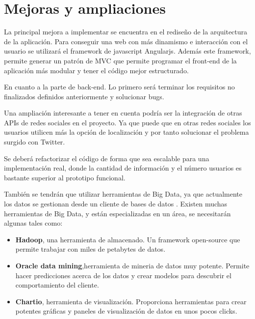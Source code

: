 \section{Mejoras y ampliaciones}

La principal mejora a implementar se encuentra en el rediseño de la arquitectura de la aplicación. Para conseguir una web con más dinamismo e interacción con el usuario se utilizará el
framework de javascript Angularjs. Además este framework, permite generar un patrón de MVC que permite programar el front-end de la aplicación más modular y tener el código mejor estructurado.

\vspace{5 mm}

En cuanto a la parte de back-end. Lo primero será terminar los requisitos no finalizados definidos anteriormente y solucionar bugs.

Una ampliación interesante a tener en cuenta podría ser la integración de otras APIs de redes sociales en el proyecto. Ya que puede que en otras redes
sociales los usuarios utilicen más la opción de localización y por tanto solucionar el problema surgido con Twitter. 


Se deberá refactorizar el código de forma que sea escalable para una implementación real, donde la cantidad de información y el número
usuarios es bastante superior al prototipo funcional.

\vspace{5 mm}

También se tendrán que utilizar herramientas de Big Data, ya que actualmente los datos se gestionan desde un cliente de bases de datos \cite{big-data-tools}.
Existen muchas herramientas de Big Data, y están especializadas en un área, se necesitarán algunas tales como:


\begin{itemize}
  \item \textbf{Hadoop}, una herramienta de almacenado. Un framework open-source que permite trabajar con miles de petabytes de datos.
  \item \textbf{Oracle data mining},herramienta de mineria de datos muy potente. Permite hacer predicciones acerca de los datos y crear modelos para descubrir el comportamiento del cliente.
  \item \textbf{Chartio}, herramienta de visualización. Proporciona herramientas para crear potentes gráficas y paneles de visualización de datos en
  unos pocos clicks.
\end{itemize}

